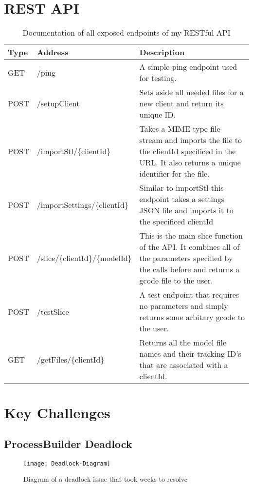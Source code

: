 \section{REST API}
\begin{table}[h]
  \centering
    \begin{tabularx}{\textwidth}{ |l|l|X| }
      \hline
      Type & Address & Description \\ \hline
      \hline
      GET & /ping & A simple ping endpoint used for testing. \\ \hline
      POST & /setupClient & Sets aside all needed files for a new client and return its unique ID. \\ \hline
      POST & /importStl/\{clientId\} & Takes a MIME type file stream and imports the file to the clientId specificed in the URL. It also returns a unique identifier for the file. \\ \hline
      POST & /importSettings/\{clientId\} & Similar to importStl this endpoint takes a settings JSON file and imports it to the specificed clientId \\ \hline
      POST & /slice/\{clientId\}/\{modelId\} & This is the main slice function of the API. It combines all of the parameters specified by the calls before and returns a gcode file to the user. \\ \hline
      POST & /testSlice & A test endpoint that requires no parameters and simply returns some arbitary gcode to the user. \\ \hline
      GET & /getFiles/\{clientId\} & Returns all the model file names and their tracking ID's that are associated with a clientId. \\ \hline
    \end{tabularx}
  \caption{Documentation of all exposed endpoints of my RESTful API}
  \label{tab:restapi}
\end{table}

\paragraph{}


\section{Key Challenges}
\subsection{ProcessBuilder Deadlock}
\begin{figure}[!ht]
  \centering
  \texttt{[image: Deadlock-Diagram]}
  \caption{Diagram of a deadlock issue that took weeks to resolve}
  \label{fig:deadlock-diagram}
\end{figure}
